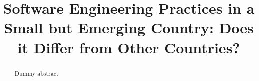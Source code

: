 \documentclass[acmsmall,table,xcdraw]{acmart}
\title{Software Engineering Practices in a Small but Emerging Country: Does it Differ from Other Countries?}
\begin{document}
\begin{abstract}
Dummy abstract
\end{abstract}
\maketitle



% 
% 


% 
% 
% 





\pagebreak
\appendix

    
\end{document}
